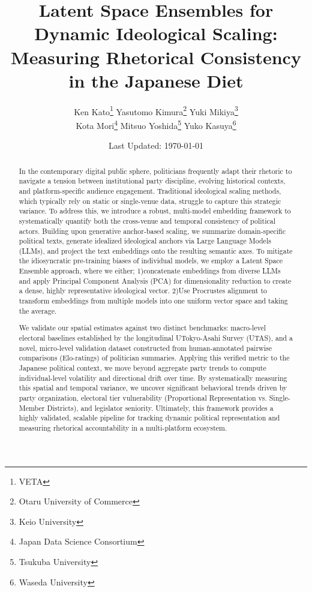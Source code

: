 \documentclass[11pt,letterpaper]{article}
\theoremstyle{plain}
\begin{document}
\title{\bf Latent Space Ensembles for Dynamic Ideological Scaling: Measuring Rhetorical Consistency in the Japanese Diet}
\author{
Ken Kato\thanks{VETA} \qquad
Yasutomo Kimura\thanks{Otaru University of Commerce} \qquad
Yuki Mikiya\thanks{Keio University} \\[1.5em]
Kota Mori\thanks{Japan Data Science Consortium} \qquad
Mitsuo Yoshida\thanks{Tsukuba University} \qquad
Yuko Kasuya\thanks{Waseda University}
}
\date{
Last Updated: \today
}
\maketitle\thispagestyle{empty}
\tableofcontents\thispagestyle{empty}

\begin{abstract}
\noindent 
In the contemporary digital public sphere, politicians frequently adapt their rhetoric to navigate a tension between institutional party discipline, evolving historical contexts, and platform-specific audience engagement. Traditional ideological scaling methods, which typically rely on static or single-venue data, struggle to capture this strategic variance. To address this, we introduce a robust, multi-model embedding framework to systematically quantify both the cross-venue and temporal consistency of political actors. Building upon generative anchor-based scaling, we summarize domain-specific political texts, generate idealized ideological anchors via Large Language Models (LLMs), and project the text embeddings onto the resulting semantic axes. To mitigate the idiosyncratic pre-training biases of individual models, we employ a Latent Space Ensemble approach, where we either; 1)concatenate embeddings from diverse LLMs and apply Principal Component Analysis (PCA) for dimensionality reduction to create a dense, highly representative ideological vector. 2)Use Procrustes alignment to transform embeddings from multiple models into one uniform vector space and taking the average. 

We validate our spatial estimates against two distinct benchmarks: macro-level electoral baselines established by the longitudinal UTokyo-Asahi Survey (UTAS), and a novel, micro-level validation dataset constructed from human-annotated pairwise comparisons (Elo-ratings) of politician summaries. Applying this verified metric to the Japanese political context, we move beyond aggregate party trends to compute individual-level volatility and directional drift over time. By systematically measuring this spatial and temporal variance, we uncover significant behavioral trends driven by party organization, electoral tier vulnerability (Proportional Representation vs. Single-Member Districts), and legislator seniority. Ultimately, this framework provides a highly validated, scalable pipeline for tracking dynamic political representation and measuring rhetorical accountability in a multi-platform ecosystem.
\end{abstract}
\end{document}
